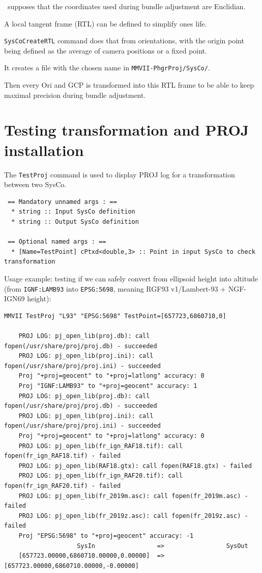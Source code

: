 \CdPPP\ supposes that the coordinates used during bundle adjustment are Euclidian.

A local tangent frame (RTL) can be defined to simplify ones life. 

\texttt{SysCoCreateRTL} command does that from orientations, with the origin point being defined as the average of camera positions or a fixed point.

It creates a file with the chosen name in \texttt{MMVII-PhgrProj/SysCo/}.

Then every Ori and GCP is transformed into this RTL frame to be able to keep maximal precision during bundle adjustment.


\section{Testing transformation and PROJ installation}
The \texttt{TestProj} command is used to display PROJ log for a transformation between two SysCo.

\begin{verbatim}
 == Mandatory unnamed args : ==
  * string :: Input SysCo definition
  * string :: Output SysCo definition

 == Optional named args : ==
  * [Name=TestPoint] cPtxd<double,3> :: Point in input SysCo to check transformation
\end{verbatim}

Usage example: testing if we can safely convert from ellipsoid height into altitude
(from \texttt{IGNF:LAMB93} into \texttt{EPSG:5698}, meaning RGF93 v1/Lambert-93 + NGF-IGN69 height):

\begin{verbatim}
MMVII TestProj "L93" "EPSG:5698" TestPoint=[657723,6860710,0]

    PROJ LOG: pj_open_lib(proj.db): call fopen(/usr/share/proj/proj.db) - succeeded
    PROJ LOG: pj_open_lib(proj.ini): call fopen(/usr/share/proj/proj.ini) - succeeded
    Proj "+proj=geocent" to "+proj=latlong" accuracy: 0
    Proj "IGNF:LAMB93" to "+proj=geocent" accuracy: 1
    PROJ LOG: pj_open_lib(proj.db): call fopen(/usr/share/proj/proj.db) - succeeded
    PROJ LOG: pj_open_lib(proj.ini): call fopen(/usr/share/proj/proj.ini) - succeeded
    Proj "+proj=geocent" to "+proj=latlong" accuracy: 0
    PROJ LOG: pj_open_lib(fr_ign_RAF18.tif): call fopen(fr_ign_RAF18.tif) - failed
    PROJ LOG: pj_open_lib(RAF18.gtx): call fopen(RAF18.gtx) - failed
    PROJ LOG: pj_open_lib(fr_ign_RAF20.tif): call fopen(fr_ign_RAF20.tif) - failed
    PROJ LOG: pj_open_lib(fr_2019m.asc): call fopen(fr_2019m.asc) - failed
    PROJ LOG: pj_open_lib(fr_2019z.asc): call fopen(fr_2019z.asc) - failed
    Proj "EPSG:5698" to "+proj=geocent" accuracy: -1
                    SysIn                 =>                 SysOut                
    [657723.00000,6860710.00000,0.00000]  =>  [657723.00000,6860710.00000,-0.00000]
\end{verbatim}

